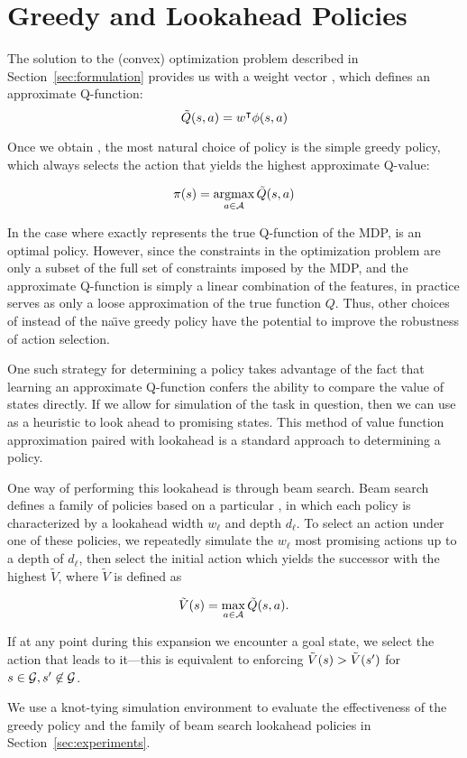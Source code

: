 \section{Greedy and Lookahead Policies}

The solution to the (convex) optimization problem described in 
Section~\ref{sec:formulation} provides us with a weight vector \weights{}, which defines 
an approximate Q-function:
\begin{equation}
  \tilde{Q}(s,a) = w^\intercal \phi({s}, {a})
\end{equation}

Once we obtain \approxq{}, the most natural choice of policy is the
simple greedy policy, which always selects the action that yields the highest
approximate Q-value:

\begin{equation}
  \pi(s) = \operatorname*{argmax}_{a \in \mathcal{A}} \tilde{Q}(s,a)
\end{equation}

In the case where \approxq{} exactly represents the true Q-function of the MDP,
\policyvar{} is an optimal policy. However, since the constraints in the optimization
problem are only a subset of the full set of constraints imposed by the MDP, and
the approximate Q-function is simply a linear combination of the features, in
practice \approxq{} serves as only a loose approximation of the true function
$Q$. Thus, other choices of \policyvar{} instead of the na\"{\i}ve greedy
policy have the potential to improve the robustness of action selection.

One such strategy for determining a policy takes advantage of the fact that
learning an approximate Q-function confers the ability to compare the value of
states directly. If we allow for simulation of the task in question, then we can
use \approxq{} as a heuristic to look ahead to promising states. This method of
value function approximation paired with lookahead is a standard approach to
determining a policy.

One way of performing this lookahead is through beam search. Beam search defines
a family of policies based on a particular \approxq{}, in which each policy is
characterized by a lookahead width $w_\ell$ and depth $d_\ell$. To select an action under
one of these policies, we repeatedly simulate the $w_\ell$ most promising actions up
to a depth of $d_\ell$, then select the initial action which yields the successor
with the highest $\tilde{V}$, where $\tilde{V}$ is defined as

\begin{equation}
  \tilde{V}(s) = \max_{a \in \mathcal{A}} \tilde{Q}(s, a).
\end{equation}


If at any point during this expansion we encounter a goal state, we select the
action that leads to it---this is equivalent to enforcing
$\tilde{V}(s{}) > \tilde{V}(s{}')$ for $s{} \in
\mathcal{G}{}, s{}' \not\in \mathcal{G}{}$.

We use a knot-tying simulation environment to evaluate the effectiveness of the
greedy policy and the family of beam search lookahead policies in
Section~\ref{sec:experiments}.
